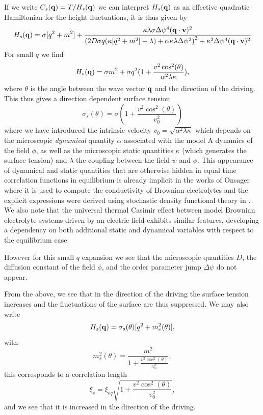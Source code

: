 If we write $C_s({\bf q})= T/H_s({\bf q})$ we can interpret $H_s({\bf q})$ as an effective quadratic Hamiltonian for the height fluctuations, it is thus given by
\begin{equation}
    H_s({\bf q}) = \sigma[q^2+m^2] + \frac{\kappa\lambda\sigma \Delta\psi^4 ({\bf q}\cdot{\bf v})^2}{\left(2 D\sigma q(\kappa[q^2+m^2]+\lambda)+\alpha\kappa\lambda\Delta\psi^2\right)^2 +\kappa^2 \Delta\psi^4 ({\bf q}\cdot{\bf v})^2}
\end{equation}
For small $q$ we find 
\begin{equation}
    H_s({\bf q}) = \sigma m^2 + \sigma q^2(1+ \frac{v^2\cos^2(\theta)}{\alpha^2\lambda\kappa}),
\end{equation}
where $\theta$ is the angle between the wave vector ${\bf q}$ and the direction of the driving. 
This thus gives a direction dependent surface tension 
\begin{equation}
    \sigma_s(\theta) = \sigma(1+ \frac{v^2\cos^2(\theta)}{v^2_0})
    \label{direction-surface-tension}
\end{equation}
where we have introduced the intrinsic velocity $v_0 = \sqrt{\alpha^2\lambda\kappa}$ which depends on the microscopic {\em dynamical} quantity $\alpha$ associated with the model A dynamics of the field $\phi$, as well as the microscopic static quantities $\kappa$ (which generates the surface tension) and $\lambda$ the coupling between the field $\psi$ and $\phi$. This appearance of dynamical and static quantities that are otherwise hidden in equal time correlation functions in equilibrium is already implicit in the works of Onsager \cite{lars_onsager_collected_1996} where it is used to compute the conductivity of Brownian electrolytes and the explicit expressions were derived using stochastic density functional theory in \cite{demery_conductivity_2016}. We also note that the universal thermal Casimir effect between model Brownian electrolyte systems  driven by an electric field 
exhibits similar features, developing a dependency on both additional static and dynamical variables with respect to the equilibrium case \cite{dean_nonequilibrium_2016}


However for this small $q$ expansion we see that the microscopic 
quantities $D$, the diffusion constant of the field $\phi$, and the order parameter jump
$\Delta\psi$ do not appear. 

From the above, we see that  in the direction of the driving the surface tension increases and the fluctuations of the surface are thus suppressed. We may also write 
\begin{equation}
    H_s({\bf q}) = \sigma_s(\theta) [q^2 + m^2_e(\theta)],
\end{equation}
with 
\begin{equation}
    m^2_s(\theta) =\frac{ m^2}{1+ \frac{v^2\cos^2(\theta)}{v_0^2}},
\end{equation}
this corresponds to a correlation length 
\begin{equation}
    \xi_s = \xi_{eq}\sqrt{1+ \frac{v^2\cos^2(\theta)}{v_0^2}},
\end{equation}
and we see that it is increased in the direction of the driving. 

